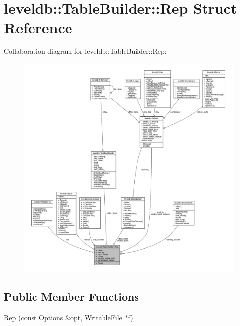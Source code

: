 \hypertarget{structleveldb_1_1_table_builder_1_1_rep}{}\section{leveldb\+:\+:Table\+Builder\+:\+:Rep Struct Reference}
\label{structleveldb_1_1_table_builder_1_1_rep}


Collaboration diagram for leveldb\+:\+:Table\+Builder\+:\+:Rep\+:
\nopagebreak
\begin{figure}[H]
\begin{center}
\leavevmode
\includegraphics[width=350pt]{structleveldb_1_1_table_builder_1_1_rep__coll__graph}
\end{center}
\end{figure}
\subsection*{Public Member Functions}
\begin{DoxyCompactItemize}
\item 
\hyperlink{structleveldb_1_1_table_builder_1_1_rep_a9d68c60c57e7336aa1fd10fc9f32213e}{Rep} (const \hyperlink{structleveldb_1_1_options}{Options} \&opt, \hyperlink{classleveldb_1_1_writable_file}{Writable\+File} $\ast$f)
\end{DoxyCompactItemize}
